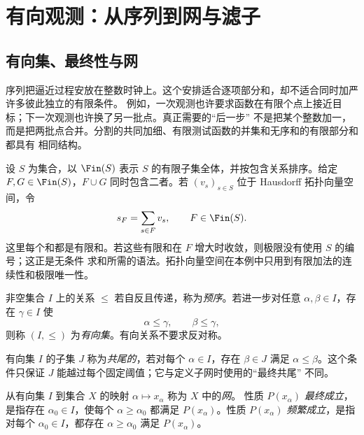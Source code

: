 \section{有向观测：从序列到网与滤子}\label{sec:01-01}

\subsection{有向集、最终性与网}\label{subsec:1-1-1}

序列把逼近过程安放在整数时钟上。这个安排适合逐项部分和，却不适合同时加严许多彼此独立的有限条件。
例如，一次观测也许要求函数在有限个点上接近目标；下一次观测也许换了另一批点。真正需要的“后一步”
不是把某个整数加一，而是把两批点合并。分割的共同加细、有限测试函数的并集和无序和的有限部分和都具有
相同结构。

\begin{example}[有限条件的有向结构]\label{ex:1-1-1-1}
设 \(S\) 为集合，以 \(\Fin(S)\) 表示 \(S\) 的有限子集全体，并按包含关系排序。给定
\(F,G\in\Fin(S)\)，\(F\cup G\) 同时包含二者。若 \((v_s)_{s\in S}\) 位于 Hausdorff 拓扑向量空间，令
\[
  s_F=\sum_{s\in F}v_s,\qquad F\in\Fin(S).
\]
这里每个和都是有限和。若这些有限和在 \(F\) 增大时收敛，则极限没有使用 \(S\) 的编号；这正是无条件
求和所需的语法。拓扑向量空间在本例中只用到有限加法的连续性和极限唯一性。
\end{example}

\begin{definition}[有向集]\label{def:1-1-1-1}
非空集合 \(I\) 上的关系 \(\leq\) 若自反且传递，称为\emph{预序}。若进一步对任意
\(\alpha,\beta\in I\)，存在 \(\gamma\in I\) 使
\[
  \alpha\leq\gamma,\qquad \beta\leq\gamma,
\]
则称 \((I,\leq)\) 为\emph{有向集}。有向关系不要求反对称。
\end{definition}

\begin{definition}[共尾子集]\label{def:1-1-1-cofinal}
有向集 \(I\) 的子集 \(J\) 称为\emph{共尾的}，若对每个 \(\alpha\in I\)，存在 \(\beta\in J\)
满足 \(\alpha\leq\beta\)。这个条件只保证 \(J\) 能越过每个固定阈值；它与定义子网时使用的“最终共尾”
不同。
\end{definition}

\begin{definition}[网、最终与频繁]\label{def:1-1-1-2}
从有向集 \(I\) 到集合 \(X\) 的映射 \(\alpha\mapsto x_\alpha\) 称为 \(X\) 中的\emph{网}。
性质 \(P(x_\alpha)\) \emph{最终成立}，是指存在 \(\alpha_0\in I\)，使每个
\(\alpha\geq\alpha_0\) 都满足 \(P(x_\alpha)\)。性质 \(P(x_\alpha)\) \emph{频繁成立}，是指对每个
\(\alpha_0\in I\)，都存在 \(\alpha\geq\alpha_0\) 满足 \(P(x_\alpha)\)。
\end{definition}

